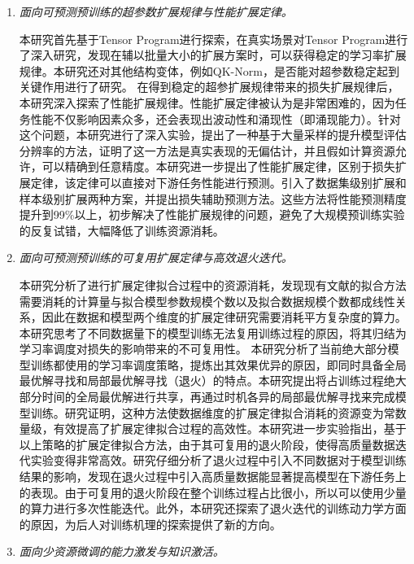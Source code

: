 \begin{enumerate}

\item \textit{面向可预测预训练的超参数扩展规律与性能扩展定律。} 

本研究首先基于Tensor Program进行探索，在真实场景对Tensor Program进行了深入研究，发现在辅以批量大小的扩展方案时，可以获得稳定的学习率扩展规律。本研究还对其他结构变体，例如QK-Norm，是否能对超参数稳定起到关键作用进行了研究。 在得到稳定的超参扩展规律带来的损失扩展规律后，本研究深入探索了性能扩展规律。性能扩展定律被认为是非常困难的，因为任务性能不仅影响因素众多，还会表现出波动性和涌现性（即涌现能力）。针对这个问题，本研究进行了深入实验，提出了一种基于大量采样的提升模型评估分辨率的方法，证明了这一方法是真实表现的无偏估计，并且假如计算资源允许，可以精确到任意精度。本研究进一步提出了性能扩展定律，区别于损失扩展定律，该定律可以直接对下游任务性能进行预测。引入了数据集级别扩展和样本级别扩展两种方案，并提出损失辅助预测方法。这些方法将性能预测精度提升到99\%以上，初步解决了性能扩展规律的问题，避免了大规模预训练实验的反复试错，大幅降低了训练资源消耗。

\item \textit{面向可预测预训练的可复用扩展定律与高效退火迭代。} 

本研究分析了进行扩展定律拟合过程中的资源消耗，发现现有文献的拟合方法需要消耗的计算量与拟合模型参数规模个数以及拟合数据规模个数都成线性关系，因此在数据和模型两个维度的扩展定律研究需要消耗平方复杂度的算力。本研究思考了不同数据量下的模型训练无法复用训练过程的原因，将其归结为学习率调度对损失的影响带来的不可复用性。 本研究分析了当前绝大部分模型训练都使用的学习率调度策略，提炼出其效果优异的原因，即同时具备全局最优解寻找和局部最优解寻找（退火）的特点。本研究提出将占训练过程绝大部分时间的全局最优解进行共享，再通过时机各异的局部最优解寻找来完成模型训练。研究证明，这种方法使数据维度的扩展定律拟合消耗的资源变为常数量级，有效提高了扩展定律拟合过程的高效性。本研究进一步实验指出，基于以上策略的扩展定律拟合方法，由于其可复用的退火阶段，使得高质量数据迭代实验变得非常高效。研究仔细分析了退火过程中引入不同数据对于模型训练结果的影响，发现在退火过程中引入高质量数据能显著提高模型在下游任务上的表现。由于可复用的退火阶段在整个训练过程占比很小，所以可以使用少量的算力进行多次性能迭代。此外，本研究还探索了退火迭代的训练动力学方面的原因，为后人对训练机理的探索提供了新的方向。

\item \textit{面向少资源微调的能力激发与知识激活。} 


\end{enumerate}
